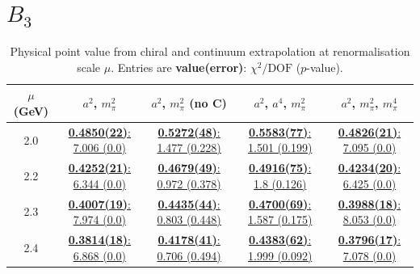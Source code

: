 \documentclass[12pt]{extarticle}
\begin{document}
\section{$B_3$}
\begin{table}[h!]
\begin{center}
\begin{tabular}{|c|c|c|c|c|}
\hline
$\mu$ (GeV) & $a^2$, $m_\pi^2$& $a^2$, $m_\pi^2$ (no C)& $a^2$, $a^4$, $m_\pi^2$& $a^2$, $m_\pi^2$, $m_\pi^4$\\
\hline
2.0& \hyperlink{SSmPP/SUSY/a2m2_20.pdf.1}{\textbf{0.4850(22)}: 7.006 (0.0)} & \hyperlink{SSmPP/SUSY/a2m2noC_20.pdf.1}{\textbf{0.5272(48)}: 1.477 (0.228)} & \hyperlink{SSmPP/SUSY/a2a4m2_20.pdf.1}{\textbf{0.5583(77)}: 1.501 (0.199)} & \hyperlink{SSmPP/SUSY/a2m2m4_20.pdf.1}{\textbf{0.4826(21)}: 7.095 (0.0)}\\
2.2& \hyperlink{SSmPP/SUSY/a2m2_22.pdf.1}{\textbf{0.4252(21)}: 6.344 (0.0)} & \hyperlink{SSmPP/SUSY/a2m2noC_22.pdf.1}{\textbf{0.4679(49)}: 0.972 (0.378)} & \hyperlink{SSmPP/SUSY/a2a4m2_22.pdf.1}{\textbf{0.4916(75)}: 1.8 (0.126)} & \hyperlink{SSmPP/SUSY/a2m2m4_22.pdf.1}{\textbf{0.4234(20)}: 6.425 (0.0)}\\
2.3& \hyperlink{SSmPP/SUSY/a2m2_23.pdf.1}{\textbf{0.4007(19)}: 7.974 (0.0)} & \hyperlink{SSmPP/SUSY/a2m2noC_23.pdf.1}{\textbf{0.4435(44)}: 0.803 (0.448)} & \hyperlink{SSmPP/SUSY/a2a4m2_23.pdf.1}{\textbf{0.4700(69)}: 1.587 (0.175)} & \hyperlink{SSmPP/SUSY/a2m2m4_23.pdf.1}{\textbf{0.3988(18)}: 8.053 (0.0)}\\
2.4& \hyperlink{SSmPP/SUSY/a2m2_24.pdf.1}{\textbf{0.3814(18)}: 6.868 (0.0)} & \hyperlink{SSmPP/SUSY/a2m2noC_24.pdf.1}{\textbf{0.4178(41)}: 0.706 (0.494)} & \hyperlink{SSmPP/SUSY/a2a4m2_24.pdf.1}{\textbf{0.4383(62)}: 1.999 (0.092)} & \hyperlink{SSmPP/SUSY/a2m2m4_24.pdf.1}{\textbf{0.3796(17)}: 7.078 (0.0)}\\
\hline
\end{tabular}
\caption{Physical point value from chiral and continuum extrapolation at renormalisation scale $\mu$. Entries are \textbf{value(error)}: $\chi^2/\text{DOF}$ ($p$-value).}
\end{center}
\end{table}
\end{document}
